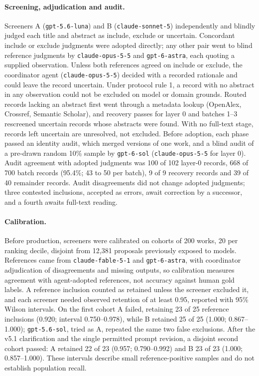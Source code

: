 \paragraph{Screening, adjudication and audit.}
Screeners A (\texttt{gpt-5.6-luna}) and B (\texttt{claude-sonnet-5}) independently and blindly judged each title and abstract as include, exclude or uncertain. %
Concordant include or exclude judgments were adopted directly; any other pair went to blind reference judgments by \texttt{claude-opus-5-5} and \texttt{gpt-6-astra}, each quoting a supplied observation. %
Unless both references agreed on include or exclude, the coordinator agent (\texttt{claude-opus-5-5}) decided with a recorded rationale and could leave the record uncertain. %
Under protocol rule 1, a record with no abstract in any observation could not be excluded on model or domain grounds. %
Routed records lacking an abstract first went through a metadata lookup (OpenAlex, Crossref, Semantic Scholar), and recovery passes for layer 0 and batches 1--3 rescreened uncertain records whose abstracts were found. %
With no full-text stage, records left uncertain are unresolved, not excluded. %
Before adoption, each phase passed an identity audit, which merged versions of one work, and a blind audit of a pre-drawn random 10\% sample by \texttt{gpt-6-sol} (\texttt{claude-opus-5-5} for layer 0). %
Audit agreement with adopted judgments was 100 of 102 layer-0 records, 668 of 700 batch records (95.4\%; 43 to 50 per batch), 9 of 9 recovery records and 39 of 40 remainder records. %
Audit disagreements did not change adopted judgments; three contested inclusions, accepted as errors, await correction by a successor, and a fourth awaits full-text reading. %

\paragraph{Calibration.}
Before production, screeners were calibrated on cohorts of 200 works, 20 per ranking decile, disjoint from 12,381 proposals previously exposed to models. %
References came from \texttt{claude-fable-5-1} and \texttt{gpt-6-astra}, with coordinator adjudication of disagreements and missing outputs, so calibration measures agreement with agent-adopted references, not accuracy against human gold labels. %
A reference inclusion counted as retained unless the screener excluded it, and each screener needed observed retention of at least 0.95, reported with 95\% Wilson intervals. %
On the first cohort A failed, retaining 23 of 25 reference inclusions (0.920; interval 0.750--0.978), while B retained 25 of 25 (1.000; 0.867--1.000); \texttt{gpt-5.6-sol}, tried as A, repeated the same two false exclusions. %
After the v5.1 clarification and the single permitted prompt revision, a disjoint second cohort passed: A retained 22 of 23 (0.957; 0.790--0.992) and B 23 of 23 (1.000; 0.857--1.000). %
These intervals describe small reference-positive samples and do not establish population recall. %

